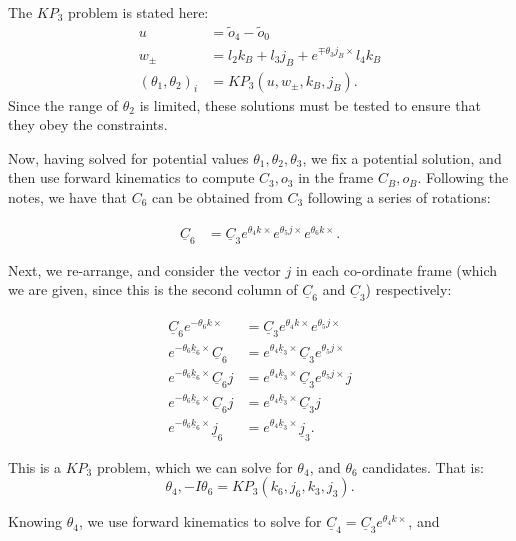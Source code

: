 \documentclass[11pt]{article}
\begin{document}
The $KP_{3}$ problem is stated here:
\begin{align}
    u &= \tilde{o}_4 - \tilde{o}_0\\
    w_{\pm} &= l_2 k_B + l_3j_B + e^{\mp \theta_3 j_B \times }l_4 k_B  \\
    (\theta_1, \theta_2)_i &= KP_{3} (u, w_{\pm}, k_B, j_B) 
.\end{align}
Since the range of $\theta_2$ is limited, these solutions must be tested to ensure that they obey the constraints.

Now, having solved for potential values $\theta_1, \theta_2, \theta_3$, we fix a potential solution, and then use forward kinematics to compute $C_3, o_3$ in the frame $C_B, o_B$.
Following the notes, we have that $C_6$ can be obtained from $C_3$ following a series of rotations:

\begin{align*}
    \underline{C}_6 &= \underline{C}_3 e^{\theta_4 k \times } e^{\theta_5 j \times } e^{\theta_6 k \times}
.\end{align*}

Next, we re-arrange, and consider the vector $j$ in each co-ordinate frame (which we are given, since this is the second column of $\underline{C}_6$ and $\underline{C}_3$) respectively:

\begin{align*}
    \underline{C}_6 e^{-\theta_6 k \times } &= \underline{C}_3 e^{\theta_4 k \times } e^{\theta_5 j \times }\\
    e^{-\theta_6 \underline{k}_6 \times } \underline{C}_6 &= e^{\theta_4 \underline{k}_3 \times }  \underline{C}_3 e^{\theta_5 j \times }\\
    e^{-\theta_6 \underline{k}_6 \times } \underline{C}_6 j &= e^{\theta_4 \underline{k}_3 \times }  \underline{C}_3 e^{\theta_5 j \times }j\\
    e^{-\theta_6 \underline{k}_6 \times } \underline{C}_6 j &= e^{\theta_4 \underline{k}_3 \times }  \underline{C}_3 j\\
    e^{-\theta_6 \underline{k}_6 \times } \underline{j}_6 &= e^{\theta_4 \underline{k}_3 \times }  \underline{j}_3
.\end{align*}

This is a $KP_3$ problem, which we can solve for $\theta_4$, and $\theta_6$ candidates.
That is:
\[
\theta_4, -I \theta_6 = KP_{3}(k_6,j_6,k_3,j_3)
.\]

Knowing $\theta_4$, we use forward kinematics to solve for $\underline{C}_4 = \underline{C}_3e^{\theta_4 k \times }$, and
\end{document}
